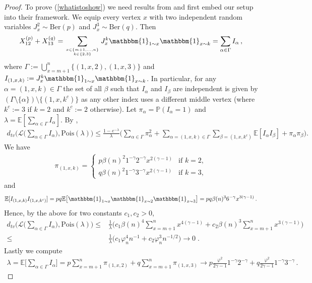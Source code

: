 \documentclass[12pt,a4paper]{article}
\numberwithin{equation}{section}
\begin{document}
\begin{proof}
   To prove (\ref{whatistoshow}) we need results from \cite{BHJ} and first embed our setup into their framework. We equip every vertex $x$ with two independent random variables $J_x^2 \sim \text{Ber}(p)$ and $J_x^3 \sim \text{Ber}(q)$. Then
   \begin{align*}
       X_{12}^{(p)}+X_{13}^{(q)} = \sum_{x\in\{m+1,\dots,n \}\atop k\in\{2,3\}} J_x^k \mathbbm{1}_{1\sim x} \mathbbm{1}_{x\sim k} = \sum_{\alpha\in\Gamma} I_\alpha \,,
   \end{align*}
   where $\Gamma := \bigcup_{x=m+1}^n \{(1,x,2), (1,x,3)\}$ and $I_{(1,x,k)}:=J_x^k \mathbbm{1}_{1\sim x} \mathbbm{1}_{x\sim k}$. 
   In particular, for any $\alpha=(1,x,k)\in\Gamma$ the set of all $\beta$ such that $I_\alpha$ and $I_\beta$ are independent is given by $(\Gamma\setminus \{\alpha\})\setminus \{(1,x,k^c)\}$ as any other index uses a different middle vertex (where $k^c:=3$ if $k=2$ and $k^c:=2$ otherwise). Let $\pi_\alpha = \mathbb{P}(I_\alpha =1)$ and $\lambda=\mathbb E [\sum_{\alpha\in\Gamma} I_\alpha]$. By  \cite[Corollary 2.C.5]{BHJ},
   \begin{align*}
       d_{tv}\Big(\mathcal{L}\big(\sum_{\alpha\in\Gamma} I_\alpha\big), \text{Pois}(\lambda) \Big) \le \frac{1-e^{-\lambda}}{\lambda}\Big(\sum_{\alpha\in\Gamma}\pi_\alpha^2 +\sum_{\alpha=(1,x,k)\in\Gamma}\sum_{\beta=(1,x,k^c)}\mathbb E[ I_\alpha I_\beta ]+\pi_\alpha\pi_\beta\Big).
   \end{align*}
   We have 
   \begin{align*}
       \pi_{(1,x,k)} = \left\{\begin{matrix} p \beta(n)^2 1^{-\gamma}2^{-\gamma} x^{2(\gamma-1)} & \text{if } k=2,\\ q \beta(n)^2 1^{-\gamma}3^{-\gamma} x^{2(\gamma-1)}& \text{if } k=3,   \end{matrix} \right.
   \end{align*}
and 
\begin{align*}
    \mathbb E[ I_{(1,x,k)} I_{(1,x,k^c)} ]=pq \mathbb E\big[ \mathbbm{1}_{1\sim x} \mathbbm{1}_{x\sim 2}\mathbbm{1}_{x\sim 3}\big]=pq  \beta(n)^3 6^{-\gamma} x^{3(\gamma-1)}\,.
\end{align*}
Hence, by the above for two constants $c_1,c_2>0$,
\begin{align*}
     d_{tv}\Big(\mathcal{L}\big(\sum_{\alpha\in\Gamma} I_\alpha\big), \text{Pois}(\lambda) \Big) \le & \frac{1}{\lambda}\Big(c_1\beta(n)^4\sum_{x=m+1}^nx^{4(\gamma-1)} +c_2\beta(n)^3\sum_{x=m+1}^nx^{3(\gamma-1)}\Big)
      \\ \le & \frac{1}{\lambda}\big( c_1 \varphi_n^4 n^{-1}+c_2 \varphi_n^3 n^{-1/2}\big) \to 0 \;.
\end{align*}
Lastly we compute 
\begin{align*}
    \lambda=\mathbb E \Big[\sum_{\alpha\in\Gamma} I_\alpha\Big]= p  \sum_{x=m+1}^n \pi_{(1,x,2)} + q  \sum_{x=m+1}^n \pi_{(1,x,3)} \to p\tfrac{\varphi^2}{2\gamma-1}  1^{-\gamma}2^{-\gamma} + q \tfrac{\varphi^2}{2\gamma-1} 1^{-\gamma}3^{-\gamma} \,.
\end{align*}
\end{proof}
\end{document}
